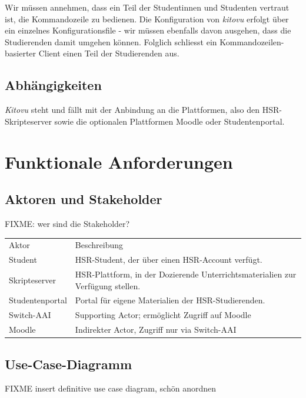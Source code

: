 \documentclass[a4paper]{article}
\let\oldsection\section
\renewcommand\section{\clearpage\oldsection}
\begin{document}
Wir müssen annehmen, dass ein Teil der Studentinnen und Studenten vertraut ist, die Kommandozeile zu bedienen. Die Konfiguration von \emph{kitovu} erfolgt über ein einzelnes Konfigurationsfile - wir müssen ebenfalls davon ausgehen, dass die Studierenden damit umgehen können. Folglich schliesst ein Kommandozeilen-basierter Client einen Teil der Studierenden aus.

\subsection{Abhängigkeiten}
\emph{Kitovu} steht und fällt mit der Anbindung an die Plattformen, also den HSR-Skripteserver sowie die optionalen Plattformen Moodle oder Studentenportal.

\pagebreak
\section{Funktionale Anforderungen}

\subsection{Aktoren und Stakeholder}
FIXME: wer sind die Stakeholder?

\begin{tabulary}{\linewidth}{lL}
	\toprule
	Aktor & Beschreibung\\
	Student & HSR-Student, der über einen HSR-Account verfügt.\\
	Skripteserver & HSR-Plattform, in der Dozierende Unterrichtsmaterialien zur Verfügung stellen.\\
	Studentenportal & Portal für eigene Materialien der HSR-Studierenden.\\
	Switch-AAI & Supporting Actor; ermöglicht Zugriff auf Moodle \\	
	Moodle & Indirekter Actor, Zugriff nur via Switch-AAI \\
	
	\bottomrule
\end{tabulary}

\subsection{Use-Case-Diagramm}

FIXME insert definitive use case diagram, schön anordnen
\end{document}
